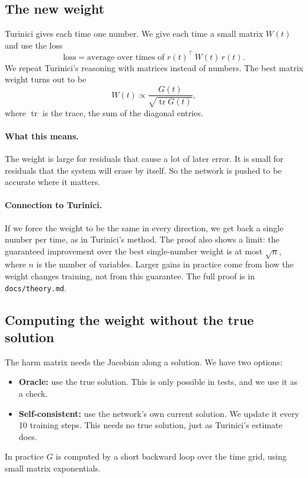 \documentclass[11pt,a4paper]{article}
\begin{document}
\subsection{The new weight}
Turinici gives each time one number. We give each time a small matrix $W(t)$ and use the
loss
\[
 \text{loss} = \text{average over times of } r(t)^{\top}\,W(t)\,r(t).
\]
We repeat Turinici's reasoning with matrices instead of numbers. The best matrix weight
turns out to be
\[
 W(t) \propto \frac{G(t)}{\sqrt{\operatorname{tr}G(t)}},
\]
where $\operatorname{tr}$ is the trace, the sum of the diagonal entries.

\paragraph{What this means.} The weight is large for residuals that cause a lot of later
error. It is small for residuals that the system will erase by itself. So the network is
pushed to be accurate where it matters.

\paragraph{Connection to Turinici.} If we force the weight to be the same in every
direction, we get back a single number per time, as in Turinici's method. The proof also
shows a limit: the guaranteed improvement over the best single-number weight is at most
$\sqrt{n}$, where $n$ is the number of variables. Larger gains in practice come from how
the weight changes training, not from this guarantee. The full proof is in
\texttt{docs/theory.md}.

\subsection{Computing the weight without the true solution}
The harm matrix needs the Jacobian along a solution. We have two options:
\begin{itemize}
\item \textbf{Oracle:} use the true solution. This is only possible in tests, and we use it
  as a check.
\item \textbf{Self-consistent:} use the network's own current solution. We update it every
  10 training steps. This needs no true solution, just as Turinici's estimate does.
\end{itemize}
In practice $G$ is computed by a short backward loop over the time grid, using small
matrix exponentials.
\end{document}
